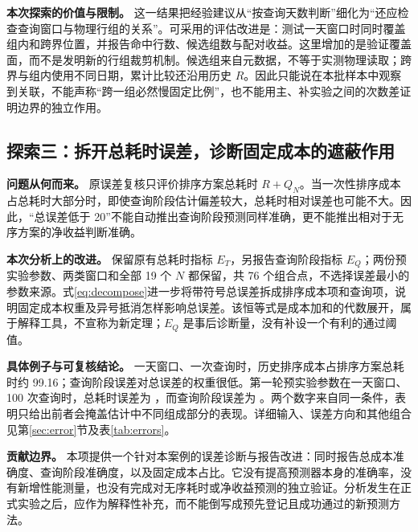 \textbf{本次探索的价值与限制。}
这一结果把经验建议从“按查询天数判断”细化为“还应检查查询窗口与物理行组的关系”。可采用的评估改进是：测试一天窗口时同时覆盖组内和跨界位置，并报告命中行数、候选组数与配对收益。这里增加的是验证覆盖面，而不是发明新的行组裁剪机制。候选组来自元数据，不等于实测物理读取；跨界与组内使用不同日期，累计比较还沿用历史 $R$。因此只能说在本批样本中观察到关联，不能声称“跨一组必然慢固定比例”，也不能用主、补实验之间的次数差证明边界的独立作用。

\subsection{探索三：拆开总耗时误差，诊断固定成本的遮蔽作用}
\label{sec:innovation-error}
\textbf{问题从何而来。}
原误差复核只评价排序方案总耗时 $R+Q_N$。当一次性排序成本占总耗时大部分时，即使查询阶段估计偏差较大，总耗时相对误差也可能不大。因此，“总误差低于 20\pct{}”不能自动推出查询阶段预测同样准确，更不能推出相对于无序方案的净收益判断准确。

\textbf{本次分析上的改进。}
保留原有总耗时指标 $E_T$，另报告查询阶段指标 $E_Q$；两份预实验参数、两类窗口和全部 19 个 $N$ 都保留，共 76 个组合点，不选择误差最小的参数来源。式\eqref{eq:decompose}进一步将带符号总误差拆成排序成本项和查询项，说明固定成本权重及异号抵消怎样影响总误差。该恒等式是成本加和的代数展开，属于解释工具，不宣称为新定理；$E_Q$ 是事后诊断量，没有补设一个有利的通过阈值。

\textbf{具体例子与可复核结论。}
一天窗口、一次查询时，历史排序成本占排序方案总耗时约 99.16\pct{}；查询阶段误差对总误差的权重很低。第一轮预实验参数在一天窗口、100 次查询时，总耗时误差为 \PilotOneDayOneHundredTotalErr\pct{}，而查询阶段误差为 \PilotOneDayOneHundredQueryErr\pct{}。两个数字来自同一条件，表明只给出前者会掩盖估计中不同组成部分的表现。详细输入、误差方向和其他组合见第\ref{sec:error}节及表\ref{tab:errors}。

\textbf{贡献边界。}
本项提供一个针对本案例的误差诊断与报告改进：同时报告总成本准确度、查询阶段准确度，以及固定成本占比。它没有提高预测器本身的准确率，没有新增性能测量，也没有完成对无序耗时或净收益预测的独立验证。分析发生在正式实验之后，应作为解释性补充，而不能倒写成预先登记且成功通过的新预测方法。

